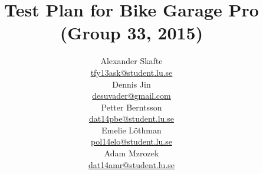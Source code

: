 \title{
	Test Plan for Bike Garage Pro (Group 33, 2015)\\
}
\author{
	Alexander Skafte\\
	\url{tfy13ask@student.lu.se}\\
	Dennis Jin\\
	\url{desuvader@gmail.com}\\
	Petter Berntsson\\
	\url{dat14pbe@student.lu.se}\\
	Emelie Löthman\\
	\url{pol14elo@student.lu.se}\\
	Adam Mzrozek\\
	\url{dat14amr@student.lu.se}
}
\date{}
